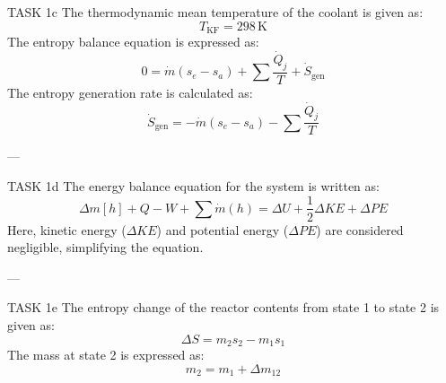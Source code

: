 TASK 1c  
The thermodynamic mean temperature of the coolant is given as:  
\[
T_{\text{KF}} = 298 \, \text{K}
\]  
The entropy balance equation is expressed as:  
\[
0 = \dot{m} \left( s_e - s_a \right) + \sum \frac{\dot{Q}_j}{T} + \dot{S}_{\text{gen}}
\]  
The entropy generation rate is calculated as:  
\[
\dot{S}_{\text{gen}} = -\dot{m} \left( s_e - s_a \right) - \sum \frac{\dot{Q}_j}{T}
\]  

---

TASK 1d  
The energy balance equation for the system is written as:  
\[
\Delta m \left[ h \right] + Q - W + \sum \dot{m} \left( h \right) = \Delta U + \frac{1}{2} \Delta KE + \Delta PE
\]  
Here, kinetic energy (\( \Delta KE \)) and potential energy (\( \Delta PE \)) are considered negligible, simplifying the equation.

---

TASK 1e  
The entropy change of the reactor contents from state 1 to state 2 is given as:  
\[
\Delta S = m_2 s_2 - m_1 s_1
\]  
The mass at state 2 is expressed as:  
\[
m_2 = m_1 + \Delta m_{12}
\]  